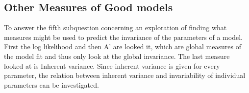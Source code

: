 \documentclass{scrartcl}
\begin{document}

\subsection{Other Measures of Good models}
To answer the fifth subquestion concerning an exploration of finding what measures might be used to predict the invariance of the parameters of a model. First the log likelihood and then A' are looked it, which are global measures of the model fit and thus only look at the global invariance. The last measure looked at is Inherent variance. Since inherent variance is given for every parameter, the relation between inherent variance and invariability of individual parameters can be investigated.
\end{document}

